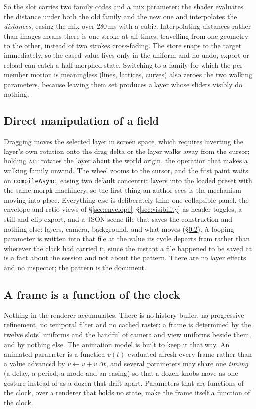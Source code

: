 So the slot carries two family codes and a mix parameter: the shader evaluates the
distance under both the old family and the new one and interpolates the
\emph{distances}, easing the mix over $280$\,ms with a cubic. Interpolating
distances rather than images means there is one stroke at all times, travelling
from one geometry to the other, instead of two strokes cross-fading. The store snaps to the
target immediately, so the eased value lives only in the uniform and no
undo, export or reload can catch a half-morphed state. Switching to a family for
which the per-member motion is meaningless (lines, lattices, curves) also
zeroes the two walking parameters, because leaving them set produces a layer whose
sliders visibly do nothing.

\subsection{Direct manipulation of a field}

Dragging moves the selected layer in screen space, which requires inverting the
layer's own rotation onto the drag delta or the layer walks away from the cursor;
holding \textsc{alt} rotates the layer about the world origin, the operation that
makes a walking family unwind. The wheel zooms to the cursor, and the first paint
waits on \texttt{compileAsync}, easing two default concentric layers into the
loaded preset with the same morph machinery, so the first thing an author sees is
the mechanism moving into place. Everything else is deliberately thin: one collapsible panel, the envelope and
ratio views of \S\ref{sec:envelope}--\S\ref{sec:visibility} as header
toggles, a still and clip export, and a JSON scene file that saves the
construction and nothing else: layers, camera, background, and what moves
(\S\ref{sec:time}). A looping parameter is written into that
file at the value its cycle departs from rather than wherever the clock had
carried it, since the instant a file happened to be saved at is a fact about the
session and not about the pattern. There are no layer effects and no inspector;
the pattern is the document.

\subsection{A frame is a function of the clock}
\label{sec:time}

Nothing in the renderer accumulates. There is no history buffer, no progressive
refinement, no temporal filter and no cached raster: a frame is determined by
the twelve slots' uniforms and the handful of camera and view uniforms beside
them, and by nothing else. The animation model is built to keep it that way. An animated parameter is
a function $v(t)$ evaluated afresh every frame rather than a value advanced by
$v \leftarrow v+\dot v\,\Delta t$, and several parameters may share one
\emph{timing} (a delay, a period, a mode and an easing) so that a dozen knobs
move as one gesture instead of as a dozen that drift apart. Parameters that are
functions of the clock, over a renderer that holds no state, make the frame
itself a function of the clock.

